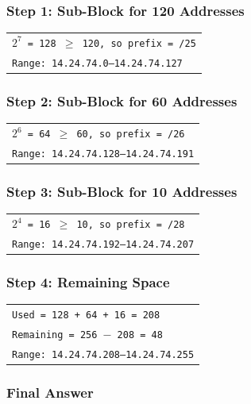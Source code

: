 \documentclass[11pt,a4paper]{article}
\begin{document}
\subsubsection*{Step 1: Sub-Block for 120 Addresses}

\begin{tabularx}{\textwidth}{@{}X@{}}
\texttt{$2^{7}$ = 128 $\ge$ 120, so prefix = /25} \\
\texttt{Range: 14.24.74.0--14.24.74.127} \\
\end{tabularx}

\subsubsection*{Step 2: Sub-Block for 60 Addresses}

\begin{tabularx}{\textwidth}{@{}X@{}}
\texttt{$2^{6}$ = 64 $\ge$ 60, so prefix = /26} \\
\texttt{Range: 14.24.74.128--14.24.74.191} \\
\end{tabularx}

\subsubsection*{Step 3: Sub-Block for 10 Addresses}

\begin{tabularx}{\textwidth}{@{}X@{}}
\texttt{$2^{4}$ = 16 $\ge$ 10, so prefix = /28} \\
\texttt{Range: 14.24.74.192--14.24.74.207} \\
\end{tabularx}

\subsubsection*{Step 4: Remaining Space}

\begin{tabularx}{\textwidth}{@{}X@{}}
\texttt{Used = 128 + 64 + 16 = 208} \\
\texttt{Remaining = 256 $-$ 208 = 48} \\
\texttt{Range: 14.24.74.208--14.24.74.255} \\
\end{tabularx}

\subsubsection*{Final Answer}
\end{document}
